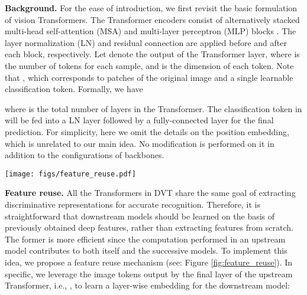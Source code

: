 \documentclass{article}
\begin{document}
\textbf{Background.}
For the ease of introduction, we first revisit the basic formulation of vision Transformers. The Transformer encoders consist of alternatively stacked multi-head self-attention (MSA) and multi-layer perceptron (MLP) blocks \cite{NIPS2017_3f5ee243, dosovitskiy2021an}. The layer normalization (LN) \cite{ba2016layer} and residual connection \cite{He_2016_CVPR} are applied before and after each block, respectively. Let  denote the output of the  Transformer layer, where  is the number of tokens for each sample, and  is the dimension of each token. Note that , which corresponds to  patches of the original image and a single learnable classification token. Formally, we have

where  is the total number of layers in the Transformer. The classification token in  will be fed into a LN layer followed by a fully-connected layer for the final prediction. For simplicity, here we omit the details on the position embedding, which is unrelated to our main idea. No modification is performed on it in addition to the configurations of backbones.




\begin{figure*}[t]
\begin{center}
    \centerline{\texttt{[image: figs/feature\_reuse.pdf]}}
\caption{
        Illustration of the feature reuse mechanism. A layer-wise context embedding is learned based on the final representations output by the upstream model, i.e., , and integrated into the MLP block of each downstream Transformer layer.
    }
    \label{fig:feature_reuse}
    \end{center}
    \vspace{-2.5ex}
\end{figure*}


\textbf{Feature reuse.}
All the Transformers in DVT share the same goal of extracting discriminative representations for accurate recognition. Therefore, it is straightforward that downstream models should be learned on the basis of previously obtained deep features, rather than extracting features from scratch. The former is more efficient since the computation performed in an upstream model contributes to both itself and the successive models. To implement this idea, we propose a feature reuse mechanism (see: Figure \ref{fig:feature_reuse}). In specific, we leverage the image tokens output by the final layer of the upstream Transformer, i.e., , to learn a layer-wise embedding  for the downstream model: 
\end{document}
